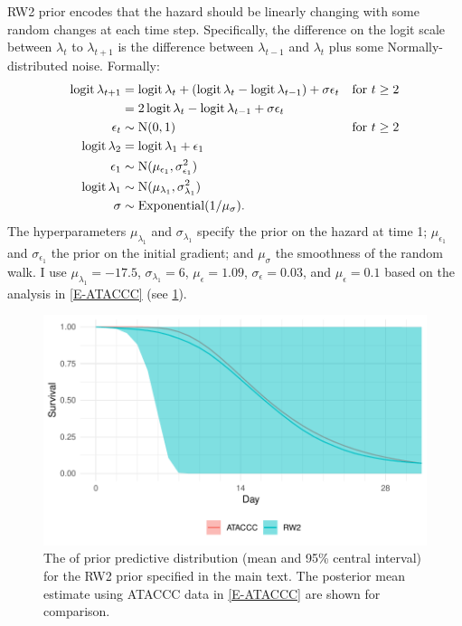 \documentclass[thesis.tex]{subfiles}
\begin{document}
RW2 prior encodes that the hazard should be linearly changing with some random changes at each time step.
Specifically, the difference on the logit scale between $\lambda_t$ to $\lambda_{t+1}$ is the difference between $\lambda_{t-1}$ and $\lambda_t$ plus some Normally-distributed noise.
Formally:
\begin{align}
  \operatorname{logit}\lambda_{t+1}
  &= \operatorname{logit}\lambda_t + (\operatorname{logit}\lambda_t - \operatorname{logit}\lambda_{t-1}) + \sigma \epsilon_t &\text{for $t \geq 2$} \\
  &= 2\operatorname{logit}\lambda_t - \operatorname{logit}\lambda_{t-1} + \sigma \epsilon_t \\
  \epsilon_t &\sim \operatorname{N}(0, 1) &\text{for $t \geq 2$}  \\
  \operatorname{logit}\lambda_2 &= \operatorname{logit}\lambda_1 + \epsilon_1 \\\
  \epsilon_1 &\sim \operatorname{N}(\mu_{\epsilon_1}, \sigma_{\epsilon_1}^2) \\
  \operatorname{logit} \lambda_1 &\sim \operatorname{N}(\mu_{\lambda_1}, \sigma_{\lambda_1}^2) \\
  \sigma &\sim \operatorname{Exponential}(1/\mu_\sigma).
\end{align}
The hyperparameters $\mu_{\lambda_1}$ and $\sigma_{\lambda_1}$ specify the prior on the hazard at time 1; $\mu_{\epsilon_1}$ and $\sigma_{\epsilon_1}$ the prior on the initial gradient; and $\mu_\sigma$ the smoothness of the random walk.
I use $\mu_{\lambda_1} = -17.5$, $\sigma_{\lambda_1} = 6$, $\mu_\epsilon = 1.09$, $\sigma_\epsilon = 0.03$, and $\mu_\epsilon = 0.1$ based on the analysis in \cref{E-ATACCC} (see \cref{perf-test:fig:rw2-prior}).
\begin{figure}
  \centering \includegraphics{cis-perfect-testing/rw2-prior}
  \caption[RW2 prior for the hazard]{The of prior predictive distribution (mean and 95\% central interval) for the RW2 prior specified in the main text. The posterior mean estimate using ATACCC data in \cref{E-ATACCC} are shown for comparison. \label{perf-test:fig:rw2-prior}}
\end{figure}
\end{document}
